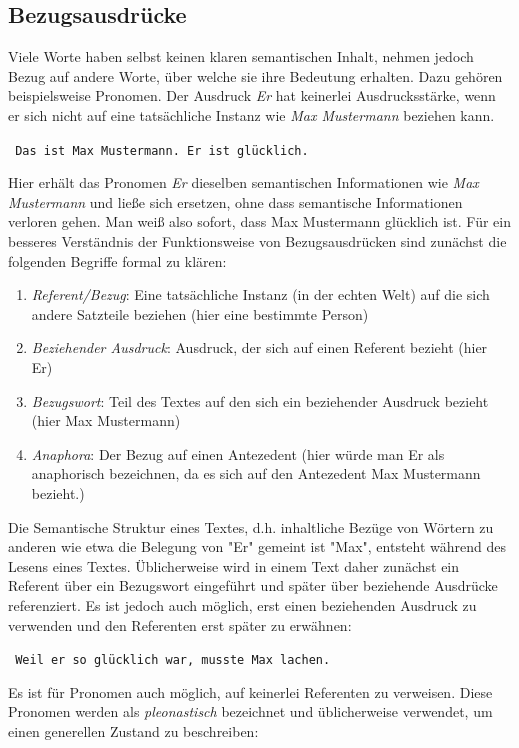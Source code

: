 \documentclass[12pt]{report}
\begin{document}
\subsection{Bezugsausdrücke}
Viele Worte haben selbst keinen klaren semantischen Inhalt, nehmen jedoch Bezug auf andere Worte, über welche sie ihre Bedeutung erhalten. Dazu gehören beispielsweise Pronomen. Der Ausdruck \textit{\glqq  Er\grqq{}} hat keinerlei Ausdrucksstärke, wenn er sich nicht auf eine tatsächliche Instanz wie \textit{\glqq  Max Mustermann\grqq{}} beziehen kann.

\tt
Das ist Max Mustermann. Er ist glücklich.
\rm

Hier erhält das Pronomen \textit{\glqq  Er\grqq{}} dieselben semantischen Informationen wie \textit{Max Mustermann} und ließe sich ersetzen, ohne dass semantische Informationen verloren gehen. Man weiß also sofort, dass Max Mustermann glücklich ist. Für ein besseres Verständnis der Funktionsweise von Bezugsausdrücken sind zunächst die folgenden Begriffe formal zu klären:

\begin{enumerate}
\item \textit{Referent/Bezug}: Eine tatsächliche Instanz (in der echten Welt) auf die sich andere Satzteile beziehen (hier eine bestimmte Person)
\item \textit{Beziehender Ausdruck}: Ausdruck, der sich auf einen Referent bezieht (hier \glqq  Er\grqq{})
\item \textit{Bezugswort}: Teil des Textes auf den sich ein beziehender Ausdruck bezieht (hier Max Mustermann)
\item \textit{Anaphora}: Der Bezug auf einen Antezedent (hier würde man \glqq  Er\grqq{} als anaphorisch bezeichnen, da es sich auf den Antezedent Max Mustermann bezieht.) 
\end{enumerate}

Die Semantische Struktur eines Textes, d.h. inhaltliche Bezüge von Wörtern zu anderen wie etwa die Belegung von "Er" gemeint ist "Max", entsteht während des Lesens eines Textes. Üblicherweise wird in einem Text daher zunächst ein Referent über ein Bezugswort eingeführt und später über beziehende Ausdrücke referenziert. Es ist jedoch auch möglich, erst einen beziehenden Ausdruck zu verwenden und den Referenten erst später zu erwähnen:

\tt
Weil er so glücklich war, musste Max lachen.
\rm

Es ist für Pronomen auch möglich, auf keinerlei Referenten zu verweisen. Diese Pronomen werden als \textit{pleonastisch} bezeichnet und üblicherweise verwendet, um einen generellen Zustand zu beschreiben:
\end{document}
